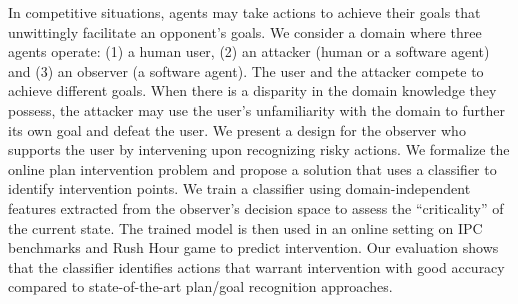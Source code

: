 
In competitive situations, agents may take actions to achieve their goals that unwittingly facilitate an opponent's goals. 
We consider a domain where three agents operate: (1) a human user, (2) an attacker (human or a software agent)  and (3) an observer (a software agent). The user and the attacker compete to achieve different goals. When there is a disparity in the domain knowledge they possess, the attacker may use the user's unfamiliarity with the domain to further its own goal and defeat the user. We present a design for the observer who supports the user by intervening upon recognizing risky actions. We formalize the online plan intervention problem and propose a solution that uses a classifier to identify intervention points. We train a classifier using domain-independent features extracted from the observer's decision space to assess the ``criticality'' of the current state. The trained model is then used in an online setting on IPC benchmarks and Rush Hour game to predict intervention. Our evaluation shows that the classifier identifies actions that warrant intervention with good accuracy compared to state-of-the-art plan/goal recognition approaches.



